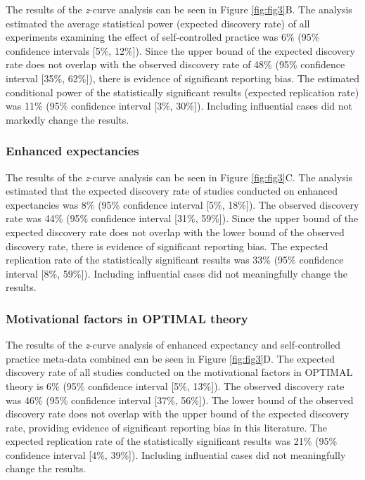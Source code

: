 \documentclass[
  doc, donotrepeattitle,floatsintext]{apa7}
\begin{document}
The results of the \emph{z}-curve analysis can be seen in Figure \ref{fig:fig3}B. The analysis estimated the average statistical power (expected discovery rate) of all experiments examining the effect of self-controlled practice was 6\% (95\% confidence intervals {[}5\%, 12\%{]}). Since the upper bound of the expected discovery rate does not overlap with the observed discovery rate of 48\% (95\% confidence interval {[}35\%, 62\%{]}), there is evidence of significant reporting bias. The estimated conditional power of the statistically significant results (expected replication rate) was 11\% (95\% confidence interval {[}3\%, 30\%{]}). Including influential cases did not markedly change the results.

\hypertarget{enhanced-expectancies-1}{%
\subsubsection{Enhanced expectancies}\label{enhanced-expectancies-1}}

The results of the \emph{z}-curve analysis can be seen in Figure \ref{fig:fig3}C. The analysis estimated that the expected discovery rate of studies conducted on enhanced expectancies was 8\% (95\% confidence interval {[}5\%, 18\%{]}). The observed discovery rate was 44\% (95\% confidence interval {[}31\%, 59\%{]}). Since the upper bound of the expected discovery rate does not overlap with the lower bound of the observed discovery rate, there is evidence of significant reporting bias. The expected replication rate of the statistically significant results was 33\% (95\% confidence interval {[}8\%, 59\%{]}). Including influential cases did not meaningfully change the results.

\hypertarget{motivational-factors-in-optimal-theory}{%
\subsubsection{Motivational factors in OPTIMAL theory}\label{motivational-factors-in-optimal-theory}}

The results of the \emph{z}-curve analysis of enhanced expectancy and self-controlled practice meta-data combined can be seen in Figure \ref{fig:fig3}D. The expected discovery rate of all studies conducted on the motivational factors in OPTIMAL theory is 6\% (95\% confidence interval {[}5\%, 13\%{]}). The observed discovery rate was 46\% (95\% confidence interval {[}37\%, 56\%{]}). The lower bound of the observed discovery rate does not overlap with the upper bound of the expected discovery rate, providing evidence of significant reporting bias in this literature. The expected replication rate of the statistically significant results was 21\% (95\% confidence interval {[}4\%, 39\%{]}). Including influential cases did not meaningfully change the results.
\end{document}
